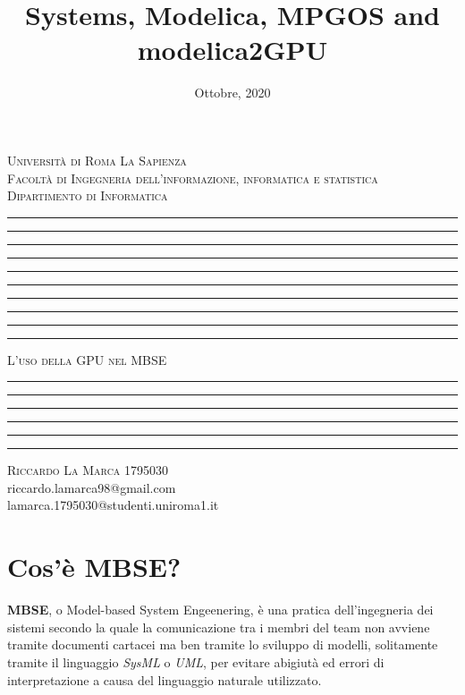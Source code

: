 \documentclass[11pt]{report}
\title{Systems, Modelica, MPGOS and modelica2GPU}
\date{Ottobre, 2020}
\makeatletter
\let\documentTitle\@title
\let\academicYear\@date
\makeatother
\begin{document}
\begin{titlepage}
    \centering
    \textsc{\Large Università di Roma La Sapienza\\[.3cm]Facoltà di Ingegneria dell'informazione, informatica e statistica\\[.3cm]Dipartimento di Informatica}
    \vspace*{1cm}
    \hrule\hrule\hrule\hrule\hrule
    \vspace*{0.1cm}
    \hrule\hrule\hrule\hrule\hrule
    \vspace*{1cm}
    \textsc{\Huge L'uso della GPU nel MBSE}
    \vspace*{1cm}
    \hrule\hrule
    \vspace*{1cm}
    \textbf{\Large \documentTitle}
    \vspace*{1cm}
    \hrule\hrule\hrule\hrule
    \vspace*{3cm}
    \textsc{\large Riccardo La Marca 1795030}\\
    \vspace*{.2cm}
    {\large riccardo.lamarca98@gmail.com}\\
    \vspace*{.2cm}
    {\large lamarca.1795030@studenti.uniroma1.it}\\
    \vspace*{8cm}
    {\normalsize \academicYear}
\end{titlepage}
\tableofcontents

\newpage
\section*{Cos'è MBSE?}
\textbf{MBSE}, o Model-based System Engeenering, è una pratica dell'ingegneria dei sistemi secondo la quale la comunicazione tra i membri del team non avviene tramite documenti cartacei ma ben tramite lo sviluppo di modelli, solitamente tramite il linguaggio \textit{SysML} o \textit{UML}, per evitare abigiutà ed errori di interpretazione a causa del linguaggio naturale utilizzato.

\end{document}
